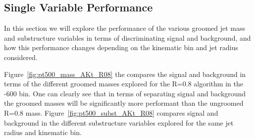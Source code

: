 \subsection{Single Variable Performance}

In this section we will explore the performance of the various groomed
jet mass and substructure variables in terms of discriminating signal
and background, and how this performance changes depending on the
kinematic bin and jet radius considered.

Figure~\ref{fig:pt500_mass_AKt_R08} the compares the signal and
background in terms of the different groomed masses explored for the
\antikt R=0.8 algorithm in the -600 bin. One can clearly see
that in terms of separating signal and background the groomed masses
will be significantly more performant than the ungroomed \antikt R=0.8
mass.
Figure~\ref{fig:pt500_subst_AKt_R08}
compares signal and background in the different substructure variables
explored for the same jet radius and kinematic bin. 

